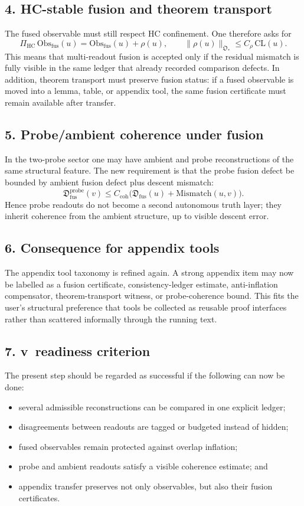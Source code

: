 \subsection*{4. HC-stable fusion and theorem transport}
The fused observable must still respect HC confinement. One therefore asks for
\[
\Pi_{\mathrm{HC}}\,\mathrm{Obs}_{\mathrm{fus}}(u)
=\mathrm{Obs}_{\mathrm{fus}}(u)+\rho(u),
\qquad
\|\rho(u)\|_{\mathfrak O_*}
\le C_{\rho}\,\mathrm{CL}(u).
\]
This means that multi-readout fusion is accepted only if the residual mismatch is
fully visible in the same ledger that already recorded comparison defects. In
addition, theorem transport must preserve fusion status: if a fused observable is
moved into a lemma, table, or appendix tool, the same fusion certificate must
remain available after transfer.

\subsection*{5. Probe/ambient coherence under fusion}
In the two-probe sector one may have ambient and probe reconstructions of the same
structural feature. The new requirement is that the probe fusion defect be bounded
by ambient fusion defect plus descent mismatch:
\[
\mathfrak D^{\mathrm{probe}}_{\mathrm{fus}}(v)
\le C_{\mathrm{coh}}
\bigl(
\mathfrak D_{\mathrm{fus}}(u)+\mathrm{Mismatch}(u,v)
\bigr).
\]
Hence probe readouts do not become a second autonomous truth layer; they inherit
coherence from the ambient structure, up to visible descent error.

\subsection*{6. Consequence for appendix tools}
The appendix tool taxonomy is refined again. A strong appendix item may now be
labelled as a fusion certificate, consistency-ledger estimate, anti-inflation
compensator, theorem-transport witness, or probe-coherence bound. This fits the
user's structural preference that tools be collected as reusable proof interfaces
rather than scattered informally through the running text.

\subsection*{7. v\docversion\ readiness criterion}
The present step should be regarded as successful if the following can now be
done:
\begin{itemize}
  \item several admissible reconstructions can be compared in one explicit ledger;
  \item disagreements between readouts are tagged or budgeted instead of hidden;
  \item fused observables remain protected against overlap inflation;
  \item probe and ambient readouts satisfy a visible coherence estimate; and
  \item appendix transfer preserves not only observables, but also their fusion certificates.
\end{itemize}

